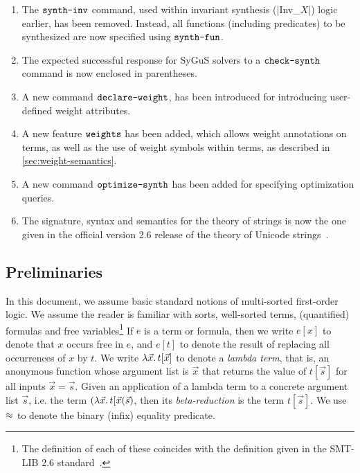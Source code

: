 \documentclass[english,a4paper,10pt]{article}
\begin{document}
\begin{enumerate}
\item The $\texttt{synth-inv}$ command, used within invariant synthesis (\code|Inv_$X$|) logic earlier, has been removed.
Instead, all functions (including predicates) to be synthesized are now specified using $\texttt{synth-fun}$.

\item The expected successful response for SyGuS solvers to a $\texttt{check-synth}$ command is now enclosed in parentheses.

\item A new command $\texttt{declare-weight}$, has been introduced for introducing user-defined weight attributes.

\item A new feature $\texttt{weights}$ has been added, which allows weight annotations on terms, 
as well as the use of weight symbols within terms, as described in \cref{sec:weight-semantics}.

\item A new command $\texttt{optimize-synth}$ has been added for specifying optimization queries.

\item
The signature, syntax and semantics for the theory of strings
is now the one given in the official version 2.6 release of the theory of Unicode strings~\cite{BarFT-RR-17}.
\end{enumerate}


\subsection{Preliminaries}
In this document, we assume basic standard notions of
multi-sorted first-order logic.
We assume the reader is familiar
with sorts, well-sorted terms, (quantified) formulas
and free variables\footnote{
The definition of each of these coincides with
the definition given in the SMT-LIB 2.6 standard~\cite{BarFT-RR-17}.
}
If $e$ is a term or formula,
then we write $e[x]$ to denote that $x$ occurs free in $e$,
and $e[t]$ to denote the result of replacing all occurrences of $x$ by $t$.
We write $\lambda \vec{x} \ldotp t[\vec{x}]$ to denote a \emph{lambda term},
that is, an anonymous function whose argument list is $\vec{x}$
that returns the value of $t[\vec{s}]$ for all inputs $\vec{x} = \vec{s}$.
Given an application of a lambda term to a concrete argument list $\vec{s}$,
i.e. the term $(\lambda \vec{x} \ldotp t[\vec{x}( \vec{s} )$,
then its \emph{beta-reduction} is the term $t[\vec{s}]$.
We use $\approx$ to denote the binary (infix) equality predicate.
\end{document}
